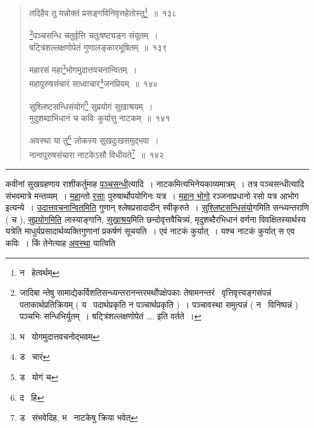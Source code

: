 \documentclass[11pt, openany]{book}
\begin{document}
\begin{quote}
{\na तदिहैव तु यन्नोक्तं प्रसङ्गविनिवृत्तहेतोस्तु\renewcommand{\thefootnote}{1}\footnote{न \textendash\ हेत्वर्थम्}~॥~१३८

\renewcommand{\thefootnote}{2}\footnote{जादिबा न्तेषु सामाद्येकर्विशतिसन्ध्यन्तरानन्तरमर्थोपक्षेपकाः तेषामनन्तरं \textendash\ {\qt वृत्तिवृत्त्यङ्गसंपन्नं पताकार्थप्रतिक्रियम् ( य \textendash\ पदार्थप्रकृति न पञ्चार्थप्रकृति )~। पञ्चावस्था समुत्पन्नं ( न \textendash\ विनिष्पन्नं ) पञ्चभिः सन्धिभिर्युतम्~। षट्त्रिंशल्लक्षणोपेतं \ldots. } इति वर्तते~।}पञ्चसन्धि चतुर्वृत्ति चतुःषष्ट्यङ्ग संयुतम्~।\\
षट्त्रिंशल्लक्षणोपेतं गुणालङ्कारभूषितम्~॥~१३९

महारसं महा\renewcommand{\thefootnote}{3}\footnote{भ \textendash\ योगमुदात्तवचनोद्भवम्}भोगमुदात्तवचनान्वितम्~।\\
महापुरुषसंचारं साध्वाचार\renewcommand{\thefootnote}{4}\footnote{ड \textendash\ चारं}जनप्रियम्~॥~१४०

सुश्लिष्टसन्धिसंयोगं\renewcommand{\thefootnote}{5}\footnote{ड \textendash\ योगं च} सुप्रयोगं सुखाश्रयम्~।\\
मुदुशब्दाभिधानं च कविः कुर्यात्तु नाटकम्~॥~१४१

अवस्था या तु\renewcommand{\thefootnote}{6}\footnote{द \textendash\ हि} लोकस्य सुखदुःखसमुद्भवा~।\\
नानापुरुषसंचारा नाटकेऽसौ विधीयते\renewcommand{\thefootnote}{7}\footnote{ड \textendash\ संभवेदिह, भ \textendash\ नाटकेषु क्रिया भवेत्}~॥~१४२}
\end{quote}

\hrule

\vspace{2mm}
\noindent
कवीनां सुखग्रहणाय राशीकर्तुमाह \underline{पञ्चसन्धी}त्यादि~। नाटकमित्यभिनेयकाव्यमात्रम्~। तत्र पञ्चसन्धीत्यादि संभवमात्रे मन्तव्यम्~। \underline{महा}न्तो \underline{रसाः} पुरुषार्थोपयोगिनः यत्र~। \underline{महान् भोगो} रञ्जनाप्रधानो रसो यत्र आभोग इत्यन्ये~। \underline{उदात्तवचनान्वितमिति} गुणान् श्लेषप्रसादादीन् स्वीकृरुते~। \underline{सुश्लिष्टसन्धिसंयो}गमिति सन्ध्यन्तराणि ( च ), \underline{सुप्रयोगमिति} लास्याङ्गानि, \underline{सुखाश्रय}मिति छन्दोवृत्तवैचित्र्यं, मृदुशब्दैरभिधानं वर्णना विवक्षितस्यार्थस्य यत्रेति माधुर्यप्रसादार्थव्यक्तिगुणानां प्रकर्षणं सूचयति~। एवं नाटकं कुर्यात्~। यश्च नाटकं कुर्यात् स एव कविः~। किं तेनेत्याह \underline{अवस्था} यात्विति

\newpage
\end{document}
